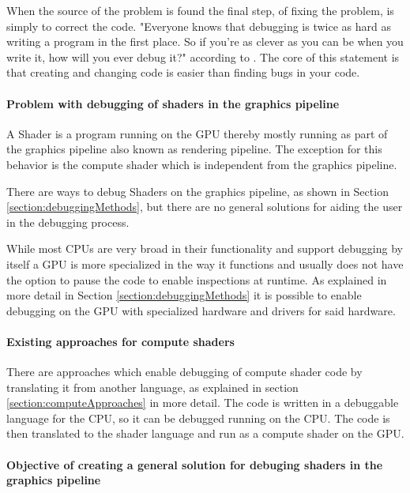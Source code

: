 When the source of the problem is found the final step, of fixing the problem, is simply to correct the code. "Everyone knows that debugging is twice as hard as writing a program in the first place. So if you're as clever as you can be when you write it, how will you ever debug it?" according to . The core of this statement is that creating and changing code is easier than finding bugs in your code.

\paragraph{Problem with debugging of shaders in the graphics pipeline}

A Shader is a program running on the GPU thereby mostly running as part of the graphics pipeline also known as rendering pipeline. The exception for this behavior is the compute shader which is independent from the graphics pipeline.

There are ways to debug Shaders on the graphics pipeline, as shown in Section \ref{section:debuggingMethods}, but there are no general solutions for aiding the user in the debugging process.

While most CPUs are very broad in their functionality and support debugging by itself a GPU is more specialized in the way it functions and usually does not have the option to pause the code to enable inspections at runtime. As explained in more detail in Section \ref{section:debuggingMethods} it is possible to enable debugging on the GPU with specialized hardware and drivers for said hardware.

\paragraph{Existing approaches for compute shaders}

There are approaches which enable debugging of compute shader code by translating it from another language, as explained in section \ref{section:computeApproaches} in more detail. The code is written in a debuggable language for the CPU, so it can be debugged running on the CPU. The code is then translated to the shader language and run as a compute shader on the GPU.

\paragraph{Objective of creating a general solution for debuging shaders in the graphics pipeline}

